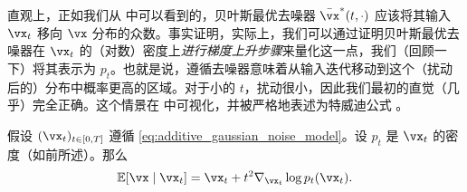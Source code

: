 \documentclass[../../book-main_zh.tex]{subfiles}
\begin{document}
直观上，正如我们从  中可以看到的，贝叶斯最优去噪器 \(\bar{\vx}^{\ast}(t, \cdot)\) 应该将其输入 \(\vx_{t}\) 移向 \(\vx\) 分布的众数。事实证明，实际上，我们可以通过证明贝叶斯最优去噪器在 \(\vx_{t}\) 的（对数）密度上\textit{进行梯度上升步骤}来量化这一点，我们（回顾一下）将其表示为 \(p_{t}\)。也就是说，遵循去噪器意味着从输入迭代移动到这个（扰动后的）分布中概率更高的区域。对于小的 \(t\)，扰动很小，因此我们最初的直觉（几乎）完全正确。这个情景在  中可视化，并被严格地表述为特威迪公式 \cite{Robbins1956AnEB}。
\begin{theorem}[特威迪公式]\label{thm:tweedie}
	假设 \((\vx_{t})_{t \in [0, T]}\) 遵循 \eqref{eq:additive_gaussian_noise_model}。设 \(p_{t}\) 是 \(\vx_{t}\) 的密度（如前所述）。那么
	\begin{equation}\label{eq:tweedie}
		\Ex[\vx \mid \vx_{t}] = \vx_{t} + t^{2}\nabla_{\vx_{t}} \log p_{t}(\vx_{t}).
	\end{equation}
\end{theorem}
\end{document}
